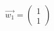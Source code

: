 \documentclass[preview]{standalone}
\begin{document}
\begin{align*}
\vec{w_1} = \begin{pmatrix} 1 \\ 1 \end{pmatrix}
\end{align*}
\end{document}
